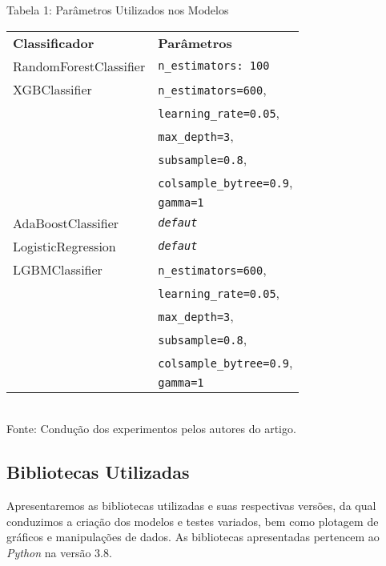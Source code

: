 Tabela 1: Parâmetros Utilizados nos Modelos
\begin{center}
\begin{tabular}{ll}

    \Xhline{2.5\arrayrulewidth}
    \textbf{Classificador} &         \textbf{Parâmetros} \\
    \Xhline{2.5\arrayrulewidth}

    RandomForestClassifier &  \texttt{\footnotesize{n\_estimators: 100}} \\
    \hline
    XGBClassifier &  \texttt{\footnotesize{n\_estimators=600}}, \\
    \textit{} &  \texttt{\footnotesize{learning\_rate=0.05}}, \\
    \textit{} &  \texttt{\footnotesize{max\_depth=3}}, \\
    \textit{} &  \texttt{\footnotesize{subsample=0.8}}, \\
    \textit{} &  \texttt{\footnotesize{colsample\_bytree=0.9}}, \\
    \textit{} &  \texttt{\footnotesize{gamma=1}} \\
    \hline
    AdaBoostClassifier &  \texttt{\footnotesize{\textit{defaut}}} \\
    \hline
    LogisticRegression &  \texttt{\footnotesize{\textit{defaut}}} \\
    \hline
    LGBMClassifier &  \texttt{\footnotesize{n\_estimators=600}}, \\
    \textit{} &  \texttt{\footnotesize{learning\_rate=0.05}}, \\
    \textit{} &  \texttt{\footnotesize{max\_depth=3}}, \\
    \textit{} &  \texttt{\footnotesize{subsample=0.8}}, \\
    \textit{} &  \texttt{\footnotesize{colsample\_bytree=0.9}}, \\
    \textit{} &  \texttt{\footnotesize{gamma=1}} \\

\end{tabular}
\\ Fonte: Condução dos experimentos pelos autores do artigo.
\end{center}

\subsection{Bibliotecas Utilizadas}

Apresentaremos as bibliotecas utilizadas e suas respectivas versões, da qual conduzimos a criação dos modelos e testes variados, bem como plotagem de gráficos e manipulações de dados. As bibliotecas apresentadas pertencem  ao \textit{Python} na versão 3.8.

